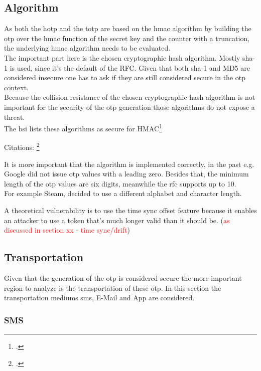 \subsection{Algorithm}

As both the \gls{hotp} and the \gls{totp} are based on the \gls{hmac} algorithm by building the \gls{otp} over the \gls{hmac} function of the secret key and the counter with a truncation, the underlying \gls{hmac} algorithm needs to be evaluated.\\
The important part here is the chosen cryptographic hash algorithm. Mostly \gls{sha}-1 is used, since it's the default of the RFC. Given that both \gls{sha}-1 and MD5 are considered insecure one has to ask if they are still considered secure in the \gls{otp} context.\\
Because the collision resistance of the chosen cryptographic hash algorithm is not important for the security of the \gls{otp} generation those algorithms do not expose a threat.\\
The \gls{bsi} lists these algorithms as secure for HMAC\footcite{bsi2019recommendations}

Citations: \footcite{10.1007/978-3-319-63688-7_19}

It is more important that the algorithm is implemented correctly, in the past e.g. Google did not issue \gls{otp} values with a leading zero. Besides that, the minimum length of the \gls{otp} values are six digits, meanwhile the \gls{rfc} supports up to 10.\\
For example Steam, decided to use a different alphabet and character length.

A theoretical vulnerability is to use the time sync offset feature because it enables an attacker to use a token that's much longer valid than it should be. (\textcolor{red}{as discussed in section xx - time sync/drift})

\subsection{Transportation}

Given that the generation of the \gls{otp} is considered secure the more important region to analyze is the transportation of these \gls{otp}. In this section the transportation mediums \gls{sms}, E-Mail and App are considered.

\subsubsection{SMS}

